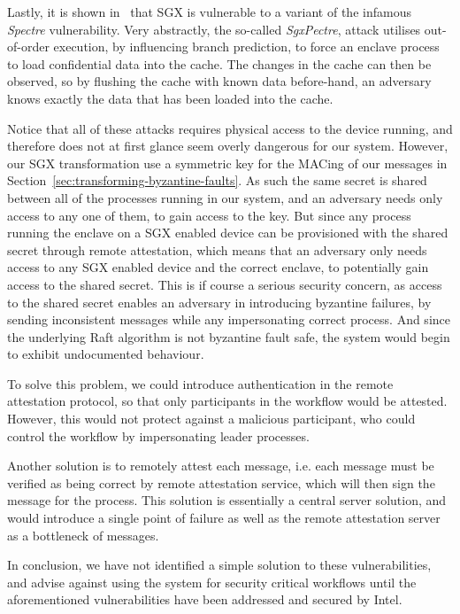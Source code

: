\documentclass{article}
\begin{document}
	Lastly, it is shown in~\cite{chen_sgxpectre_2018} that SGX is vulnerable to a variant of the infamous \textit{Spectre} vulnerability. 
	Very abstractly, the so-called \textit{SgxPectre}, attack utilises out-of-order execution, by influencing branch prediction, to force an enclave process to load confidential data into the cache.
	The changes in the cache can then be observed, so by flushing the cache with known data before-hand, an adversary knows exactly the data that has been loaded into the cache. 

	Notice that all of these attacks requires physical access to the device running, and therefore does not at first glance seem overly dangerous for our system.
	However, our SGX transformation use a symmetric key for the MACing of our messages in Section~\ref{sec:transforming-byzantine-faults}. 
	As such the same secret is shared between all of the processes running in our system, and an adversary needs only access to any one of them, to gain access to the key.
	But since any process running the enclave on a SGX enabled device can be provisioned with the shared secret through remote attestation, which means that an adversary only needs access to any SGX enabled device and the correct enclave, to potentially gain access to the shared secret.
	This is if course a serious security concern, as access to the shared secret enables an adversary in introducing byzantine failures, by sending inconsistent messages while any impersonating correct process.
	And since the underlying Raft algorithm is not byzantine fault safe, the system would begin to exhibit undocumented behaviour. 

	To solve this problem, we could introduce authentication in the remote attestation protocol, so that only participants in the workflow would be attested.
	However, this would not protect against a malicious participant, who could control the workflow by impersonating leader processes. 

	Another solution is to remotely attest each message, i.e. each message must be verified as being correct by remote attestation service, which will then sign the message for the process. 
	This solution is essentially a central server solution, and would introduce a single point of failure as well as the remote attestation server as a bottleneck of messages.

	In conclusion, we have not identified a simple solution to these vulnerabilities, and advise against using the system for security critical workflows until the aforementioned vulnerabilities have been addressed and secured by Intel. 
\end{document}

